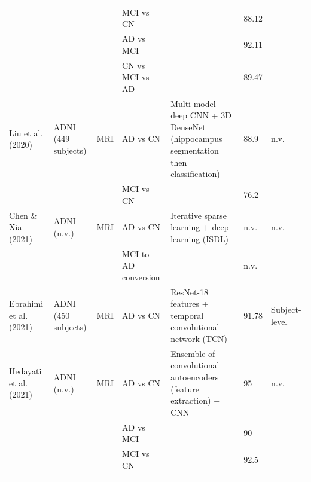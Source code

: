 \begin{table}[t]
\begin{tabular}{L{2.0cm} L{3.1cm} L{1.4cm} L{2.3cm} L{3.7cm} L{0.9cm} L{2.0cm}}
     & & & MCI vs CN & & 88.12 & \\
     & & & AD vs MCI & & 92.11 & \\
     & & & CN vs MCI vs AD & & 89.47 & \\
    \addlinespace[2pt]
    Liu et al. (2020) & ADNI (449 subjects) & MRI & AD vs CN & Multi-model deep CNN + 3D DenseNet (hippocampus segmentation then classification) & 88.9 & n.v. \\
     & & & MCI vs CN & & 76.2 & \\
    \addlinespace[2pt]
    Chen \& Xia (2021) & ADNI (n.v.) & MRI & AD vs CN & Iterative sparse learning + deep learning (ISDL) & n.v. & n.v. \\
     & & & MCI-to-AD conversion & & n.v. & \\
    \addlinespace[2pt]
    Ebrahimi et al. (2021) & ADNI (450 subjects) & MRI & AD vs CN & ResNet-18 features + temporal convolutional network (TCN) & 91.78 & Subject-level \\
    \addlinespace[2pt]
    Hedayati et al. (2021) & ADNI (n.v.) & MRI & AD vs CN & Ensemble of convolutional autoencoders (feature extraction) + CNN & 95 & n.v. \\
     & & & AD vs MCI & & 90 & \\
     & & & MCI vs CN & & 92.5 & \\
    \addlinespace[2pt]

\end{tabular}
\end{table}
